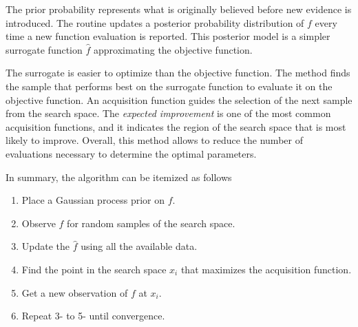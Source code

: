The prior probability represents what is originally believed before new evidence is introduced.
The routine updates a posterior probability distribution of $f$ every time a new function evaluation is reported.
This posterior model is a simpler surrogate function $\hat{f}$ approximating the objective function. 

The surrogate is easier to optimize than the objective function.
The method finds the sample that performs best on the surrogate function to evaluate it on the objective function.
An acquisition function guides the selection of the next sample from the search space.
The \textit{expected improvement} is one of the most common acquisition functions, and it indicates the region of the search space that is most likely to improve.
Overall, this method allows to reduce the number of evaluations necessary to determine the optimal parameters.

In summary, the algorithm can be itemized as follows
\begin{enumerate}
\item Place a Gaussian process prior on $f$.
\item Observe $f$ for random samples of the search space.
\item Update the $\hat{f}$ using all the available data.
\item Find the point in the search space $x_i$ that maximizes the acquisition function.
\item Get a new observation of $f$ at $x_i$.
\item Repeat 3- to 5- until convergence.
\end{enumerate}

